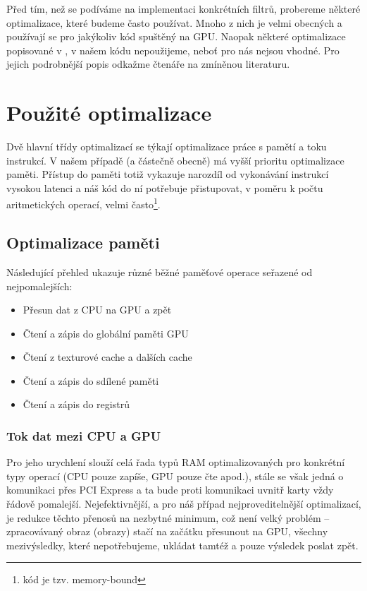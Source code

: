 
Před tím, než se podíváme na implementaci konkrétních filtrů, probereme některé optimalizace, které budeme často používat. Mnoho z nich je velmi obecných a používají se pro jakýkoliv kód spuštěný na GPU. Naopak některé optimalizace popisované v \cite{CUDA programming g.}, \cite{CUDA best practices} v našem kódu nepoužijeme, neboť pro nás nejsou vhodné. Pro jejich podrobnější popis odkažme čtenáře na zmíněnou literaturu.

\section{Použité optimalizace}

    Dvě hlavní třídy optimalizací se týkají optimalizace práce s pamětí a toku instrukcí. V našem případě (a částečně obecně) má vyšší prioritu optimalizace paměti. Přístup do paměti totiž vykazuje narozdíl od vykonávání instrukcí vysokou latenci a náš kód do ní potřebuje přistupovat, v poměru k počtu aritmetických operací, velmi často\footnote{kód je tzv. memory-bound}.

    \subsection{Optimalizace paměti}

        Následující přehled ukazuje různé běžné paměťové operace seřazené od nejpomalejších:
    \begin{itemize}
      \item Přesun dat z CPU na GPU a zpět
      \item Čtení a zápis do globální paměti GPU
      \item Čtení z texturové cache a dalších cache
      \item Čtení a zápis do sdílené paměti
      \item Čtení a zápis do registrů
    \end{itemize}

        \subsubsection{Tok dat mezi CPU a GPU}

        Pro jeho urychlení slouží celá řada typů RAM optimalizovaných pro konkrétní typy operací (CPU pouze zapíše, GPU pouze čte apod.), stále se však jedná o komunikaci přes PCI Express a ta bude proti komunikaci uvnitř karty vždy řádově pomalejší. Nejefektivnější, a pro náš případ nejproveditelnější optimalizací, je redukce těchto přenosů na nezbytné minimum, což není velký problém -- zpracovávaný obraz (obrazy) stačí na začátku přesunout na GPU, všechny mezivýsledky, které nepotřebujeme, ukládat tamtéž a pouze výsledek poslat zpět.

